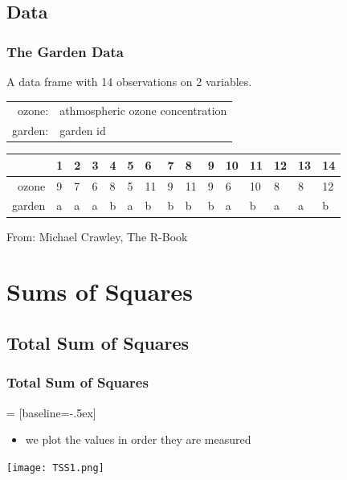 \subsection{Data}
\begin{frame}[fragile]\frametitle{The Garden Data}
A data frame with 14 observations on 2 variables. 
\begin{center}
\begin{tabular}{@{} >{\ttfamily}r l}
  ozone: & athmospheric ozone concentration               \\
  garden: & garden id                              \\
\end{tabular}

\vspace*{1cm}

\begin{table}[ht]
\small
\centering
\begin{tabular}{rllllllllllllll}
  \hline
 & 1 & 2 & 3 & 4 & 5 & 6 & 7 & 8 & 9 & 10 & 11 & 12 & 13 & 14 \\ 
  \hline
ozone &  9 &  7 &  6 &  8 &  5 & 11 &  9 & 11 &  9 &  6 & 10 &  8 &  8 & 12 \\ 
  garden & a & a & a & b & a & b & b & b & b & a & b & a & a & b \\ 
   \hline
\end{tabular}
\end{table}
\end{center}
From: Michael Crawley, The R-Book

\end{frame}

\section{Sums of Squares}
\subsection{Total Sum of Squares}

\begin{frame}\frametitle{Total Sum of Squares}
 = [baseline=-.5ex]
  \begin{itemize}
  \item  we plot the values in order they are measured
  \end{itemize}
\begin{center}
\texttt{[image: TSS1.png]}
\end{center}
\end{frame}

